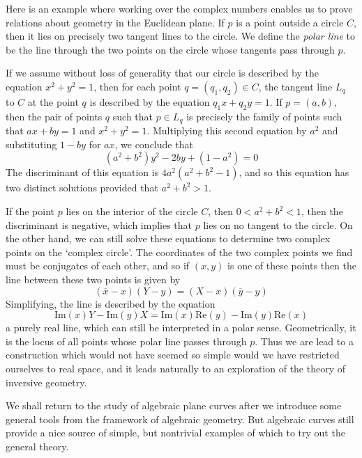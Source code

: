 \begin{example}
    Here is an example where working over the complex numbers enables us to prove relations about geometry in the Euclidean plane. If $p$ is a point outside a circle $C$, then it lies on precisely two tangent lines to the circle. We define the \emph{polar line} to be the line through the two points on the circle whose tangents pass through $p$.

    If we assume without loss of generality that our circle is described by the equation $x^2 + y^2 = 1$, then for each point $q = (q_1,q_2) \in C$, the tangent line $L_q$ to $C$ at the point $q$ is described by the equation $q_1x + q_2y = 1$. If $p = (a,b)$, then the pair of points $q$ such that $p \in L_q$ is precisely the family of points such that $ax + by = 1$ and $x^2 + y^2 = 1$. Multiplying this second equation by $a^2$ and substituting $1 - by$ for $ax$, we conclude that
    \[ (a^2 + b^2)y^2 - 2by + (1 - a^2) = 0 \]
    The discriminant of this equation is $4a^2(a^2 + b^2 - 1)$, and so this equation has two distinct solutions provided that $a^2 + b^2 > 1$.

    If the point $p$ lies on the interior of the circle $C$, then $0 < a^2 + b^2 < 1$, then the discriminant is negative, which implies that $p$ lies on no tangent to the circle. On the other hand, we can still solve these equations to determine two complex points on the `complex circle'. The coordinates of the two complex points we find must be conjugates of each other, and so if $(x,y)$ is one of these points then the line between these two points is given by
    \[ (\overline{x} - x)(Y - y) = (X - x)(\overline{y} - y) \]
    Simplifying, the line is described by the equation
    \[ \text{Im}(x) Y - \text{Im}(y) X = \text{Im}(x) \text{Re}(y) - \text{Im}(y) \text{Re}(x) \]
    a purely real line, which can still be interpreted in a polar sense. Geometrically, it is the locus of all points whose polar line passes through $p$. Thus we are lead to a construction which would not have seemed so simple would we have restricted ourselves to real space, and it leads naturally to an exploration of the theory of inversive geometry.
\end{example}

We shall return to the study of algebraic plane curves after we introduce some general tools from the framework of algebraic geometry. But algebraic curves still provide a nice source of simple, but nontrivial examples of which to try out the general theory.

